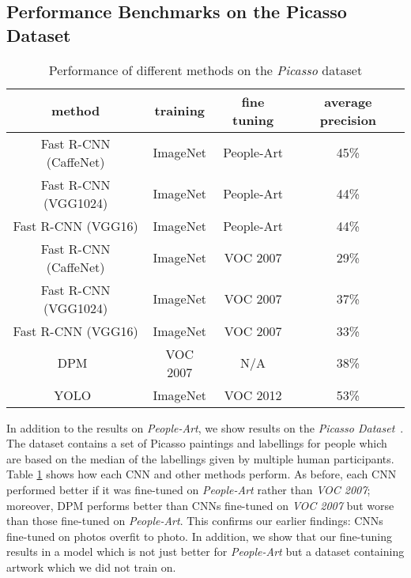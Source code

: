 \documentclass[runningheads]{llncs}
\begin{document}
\subsection{Performance Benchmarks on the Picasso Dataset}
\label{sec:PicassoBenchmarks}
\begin{table}
\begin{center}
\caption{Performance of different methods on the \textit{Picasso} dataset\label{tbl:PicassoPerformanceBenchmarks}}
\begin{tabular}{cccc}
    \hline
    \textbf{method} & \textbf{training}& \textbf{fine tuning} &
    \textbf{average precision} \\
    \hline
 Fast R-CNN (CaffeNet) & ImageNet & People-Art & 45\% \\ Fast R-CNN (VGG1024) & ImageNet & People-Art & 44\% \\ Fast R-CNN (VGG16) & ImageNet & People-Art & 44\% \\  \hline
 Fast R-CNN (CaffeNet) & ImageNet & VOC 2007 & 29\% \\ Fast R-CNN (VGG1024) & ImageNet & VOC 2007 & 37\% \\ Fast R-CNN (VGG16) & ImageNet & VOC 2007 & 33\% \\  \hline
 DPM~\cite{felzenszwalb2010object} & VOC 2007 & N/A & 38\% \\
 YOLO~\cite{redmon2015you} & ImageNet & VOC 2012 & 53\% \\
  \hline

  \end{tabular} \end{center}
\end{table}

In addition to the results on \textit{People-Art}, we show results on the \textit{Picasso Dataset}~\cite{ginosar2014detecting}.
The dataset contains a set of Picasso paintings and labellings for people which are based on the median of the labellings given by multiple human participants.
Table \ref{tbl:PicassoPerformanceBenchmarks} shows how each \ac{CNN} and other methods perform.
As before, each \ac{CNN} performed better if it was fine-tuned on \textit{People-Art} rather than \textit{VOC 2007}; moreover, \ac{DPM} performs better than \acp{CNN} fine-tuned on \textit{VOC 2007} but worse than those fine-tuned on \textit{People-Art}.
This confirms our earlier findings: \acp{CNN} fine-tuned on \acp{photo} overfit to \ac{photo}.
In addition, we show that our fine-tuning results in a model which is not just better for \textit{People-Art} but a dataset containing \ac{artwork} which we did not train on.
\end{document}
